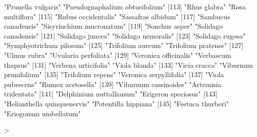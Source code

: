 \documentclass{article}
\begin{document}
\begin{Schunk}
\begin{Soutput}
[111] "Prunella vulgaris"             "Pseudognaphalium obtusifolium"
[113] "Rhus glabra"                   "Rosa multiflora"              
[115] "Rubus occidentalis"            "Sassafras albidum"            
[117] "Sambucus canadensis"           "Sisyrinchium mucronatum"      
[119] "Sonchus asper"                 "Solidago canadensis"          
[121] "Solidago juncea"               "Solidago nemoralis"           
[123] "Solidago rugosa"               "Symphyotrichum pilosum"       
[125] "Trifolium aureum"              "Trifolium pratense"           
[127] "Ulmus rubra"                   "Uvularia perfoliata"          
[129] "Veronica officinalis"          "Verbascum thapsus"            
[131] "Verbena urticifolia"           "Viola blanda"                 
[133] "Vicia cracca"                  "Viburnum prunifolium"         
[135] "Trifolium repens"              "Veronica serpyllifolia"       
[137] "Viola pubescens"               "Rumex acetosella"             
[139] "Viburnum cassinoides"          "Artemisia tridentata"         
[141] "Delphinium nuttallianum"       "Erigeron speciosus"           
[143] "Helianthella quinquenervis"    "Potentilla hippiana"          
[145] "Festuca thurberi"              "Eriogonum umbellatum"         
\end{Soutput}
\begin{Sinput}
> 
\end{Sinput}
\end{Schunk}
\end{document}
